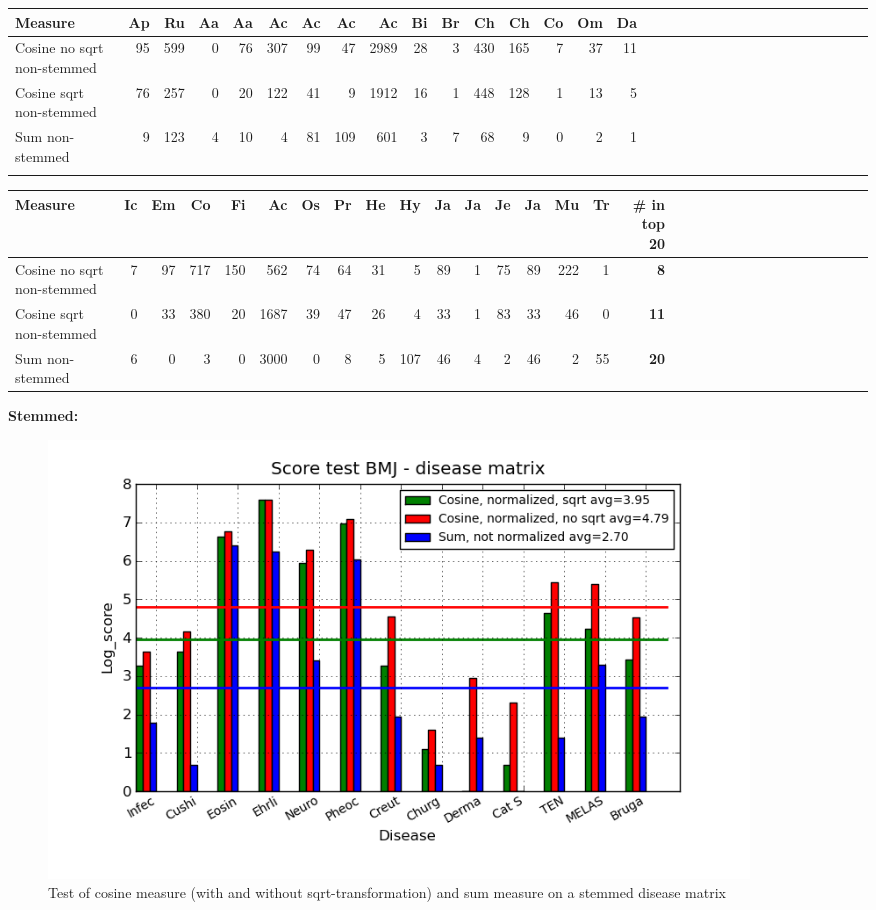 \begin{table}[H]
\begin{tiny}
  \begin{tabular}{|l|r|r|r|r|r|r|r|r|r|r|r|r|r|r|r|r|r|r|r|r|r|r|r|r|r|r|r|r|r|r|r|}
    \hline
    Measure &Ap&Ru&Aa&Aa&Ac&Ac&Ac&Ac&Bi&Br&Ch&Ch&Co&Om&Da\\
    \hline
    Cosine no sqrt non-stemmed &95&599&0&76&307&99&47&2989&28&3&430&165&7&37&11 \\
    \hline
    Cosine sqrt non-stemmed &76&257&0&20&122&41&9&1912&16&1&448&128&1&13&5 \\
    \hline
    Sum non-stemmed &9&123&4&10&4&81&109&601&3&7&68&9&0&2&1\\
    \hline
    \multicolumn{16}{c}{} \\
    \end{tabular}
    \begin{tabular}{|l|r|r|r|r|r|r|r|r|r|r|r|r|r|r|r|r|r|r|r|r|r|r|r|r|r|r|r|r|r|r|}
    \hline
     Measure &Ic&Em&Co&Fi&Ac&Os&Pr&He&Hy&Ja&Ja&Je&Ja&Mu&Tr &  \scriptsize{\textbf{\# in top 20}} \\
    \hline
     Cosine no sqrt non-stemmed &7&97&717&150&562&74&64&31&5&89&1&75&89&222&1 & \scriptsize{\textbf{8}} \\
    \hline
     Cosine sqrt non-stemmed &0&33&380&20&1687&39&47&26&4&33&1&83&33&46&0 &\scriptsize{\textbf{11}} \\
    \hline
     Sum non-stemmed &6&0&3&0&3000&0&8&5&107&46&4&2&46&2&55 & \scriptsize{\textbf{20}} \\
     \hline
  \end{tabular}
\end{tiny}
\end{table}

\textbf{Stemmed:}

\begin{figure}[H]
        \begin{center}
          \includegraphics[width=0.9\textwidth]{barcharts/diseaseMatrix_bmj_hist_norm_3000_s_cos_sqrt_cos_sum_nn.png}
        \end{center}
        \caption{Test of cosine measure (with and without sqrt-transformation) and sum measure on a stemmed disease matrix}
        \label{diseaseMatrix_bmj_hist_norm_3000_s_cos_sqrt_cos_sum_nn}
\end{figure}

